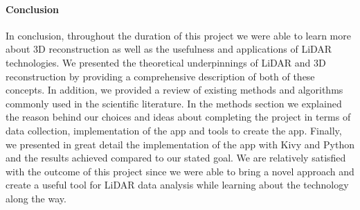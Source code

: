 \documentclass[12pt]{report}
\begin{document}
\vspace{\baselineskip}
\paragraph*{Conclusion}

\vspace{\baselineskip}
In conclusion, throughout the duration of this project we were able to learn more about 3D reconstruction as well as the usefulness and applications of LiDAR technologies. We presented the theoretical underpinnings of LiDAR and 3D reconstruction by providing a comprehensive description of both of these concepts. In addition, we provided a review of existing methods and algorithms commonly used in the scientific literature. In the methods section we explained the reason behind our choices and ideas about completing the project in terms of data collection, implementation of the app and tools to create the app. Finally, we presented in great detail the implementation of the app with Kivy and Python and the results achieved compared to our stated goal. We are relatively satisfied with the outcome of this project since we were able to bring a novel approach and create a useful tool for LiDAR data analysis while learning about the technology along the way. \par
\end{document}
